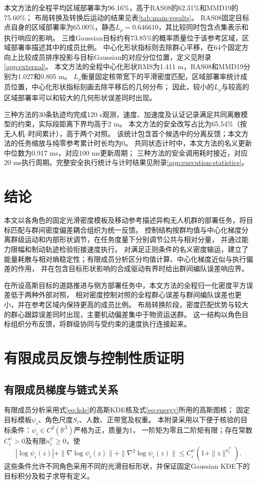 \documentclass[UTF8,a4paper,11pt,fontset=none]{ctexart}
\newcommand{\R}{\mathbb R}\newcommand{\KL}{\operatorname{KL}}
\begin{document}
本文方法的全程平均区域部署率为96.16\%，高于RAS08的62.31\%和MMD19的75.60\%；
布局转换及转换后运动的结果见表\ref{tab:main-results}。
RAS08固定目标点自身的区域部署率为65.00\%，静态$L_\rho=0.646610$，其比较同时包含点集表示和执行响应的影响。
三维Gaussian目标约有73.85\%的概率质量位于该参考区域，区域部署率描述其中的成员比例。
中心化形状指标则去除群心平移，在64个固定方向上比较成员排序投影与目标Gaussian的对应分位位置，定义见附录\ref{app:external}。
本文方法的全程中心化形状RMS为1.411 m，RAS08和MMD19分别为1.027和0.805 m。
$L_\rho$衡量固定核带宽下的平滑密度匹配，区域部署率统计成员位置，中心化形状指标刻画去除平移后的几何分布；
因此，较小的$L_\rho$与较高的区域部署率可以和较大的几何形状误差同时出现。

三种方法的30条轨迹均完成120 s观测，速度、加速度及认证记录满足共同离散模型的约束，实际段距离下界均高于2 m。
本文方法的安全改写占比为65.54\%（按无人机--时间累计），高于两个对照。
该统计包含首个候选中的分离反馈；本文方法的任务缩放与纯零参考累计时长均为0。
共同状态计时中，本文方法的名义更新中位数为0.917 ms，对应100 ms更新周期；
三种方法的安全调用耗时接近，对应20 ms执行周期。完整安全执行统计与计时结果见附录\ref{app:execution-statistics}。

\FloatBarrier
\section{结论}
本文以各角色的固定光滑密度模板及移动参考描述异构无人机群的部署任务，将目标匹配与群间密度偏差耦合组织为统一反馈。
控制结构按群均值与中心化梯度分离群级运动和内部形状调节，在任务度量下分别调节公共与相对分量，
并通过能力限幅和制动轨迹检验衔接速度执行。
对满足正则条件的名义密度输运，建立了能量耗散与相对熵稳定性；有限成员分析区分均值计算、中心化梯度近似与执行偏差的作用，
并在包含目标形状影响的合成驱动有界时给出群间编队误差响应界。

在所设高斯目标的道路推进与侧方部署任务中，本文方法的全程归一化密度平方误差低于两种外部对照，
相对密度控制对照的全程群心误差与群间编队误差也更小，并在参考区域内保持更高的成员比例。
布局转换阶段，密度匹配优势与较大的群心跟踪误差同时出现，主要机动偏差集中于物资运送群。
这一结构以角色目标组织分布反馈，将群级协同与受约束的速度执行连接起来。

\appendix
\section{有限成员反馈与控制性质证明}\label{app:interfaces}

\subsection{有限成员梯度与链式关系}\label{app:graph-query}\label{app:template-conditions}
有限成员分析采用式\eqref{eq:kde}的高斯KDE核及式\eqref{eq:energy}所用的高斯图核；
固定目标模板$\psi_i$、角色尺度$S_i$、人数、正带宽及权重。
本附录采用以下便于核验的目标条件：$\psi_i\in C^2(\R^3)$严格为正，质量为1，
一阶矩为零且二阶矩有限；存在常数$C_i^\psi>0$及有限$n_i^\psi\ge0$，使
\[
|\log\psi_i(z)|+\|\nabla\log\psi_i(z)\|+\|\nabla^2\log\psi_i(z)\|
\le C_i^\psi(1+\|z\|^{n_i^\psi}).
\]
这些条件允许不同角色采用不同的光滑目标形状，并保证固定Gaussian KDE下的目标积分及粒子求导有定义。
\end{document}
